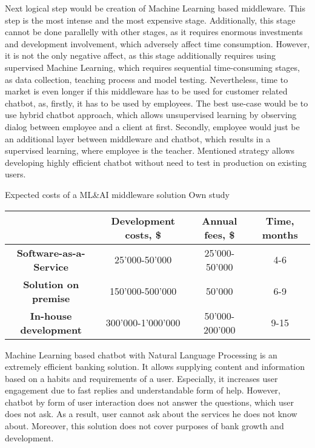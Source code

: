 Next logical step would be creation of Machine Learning based middleware.
This step is the most intense and the most expensive stage.
Additionally, this stage cannot be done parallelly with other stages, as it requires enormous investments and development involvement, which adversely affect time consumption.
However, it is not the only negative affect, as this stage additionally requires using supervised Machine Learning, which requires sequential time-consuming stages, as data collection, teaching process and model testing.
Nevertheless, time to market is even longer if this middleware has to be used for customer related chatbot, as, firstly, it has to be used by employees.
The best use-case would be to use hybrid chatbot approach, which allows unsupervised learning by observing dialog between employee and a client at first.
Secondly, employee would just be an additional layer between middleware and chatbot, which results in a supervised learning, where employee is the teacher.
Mentioned strategy allows developing highly efficient chatbot without need to test in production on existing users.

\mttable
{Expected costs of a ML\&AI middleware solution}
{Own study}
{
    \begin{tabular}{| c | c | c | c |}
        \hline
        &
        \textbf{Development costs, \$} & 
        \textbf{Annual fees, \$} &
        \textbf{Time, months} \\ \hline 
       
        \textbf{Software-as-a-Service} & 
            25'000-50'000 & 
            25'000-50'000 &
            4-6 \\ \hline 
       
        \textbf{Solution on premise} & 
            150'000-500'000 &
            50'000 &
            6-9 \\ \hline 
            
        \textbf{In-house development} &
            300'000-1'000'000 &
            50'000-200'000 &
            9-15 \\ \hline
    \end{tabular}
}

Machine Learning based chatbot with Natural Language Processing is an extremely efficient banking solution.
It allows supplying content and information based on a habits and requirements of a user.
Especially, it increases user engagement due to fast replies and understandable form of help.
However, chatbot by form of user interaction does not answer the questions, which user does not ask.
As a result, user cannot ask about the services he does not know about.
Moreover, this solution does not cover purposes of bank growth and development.

